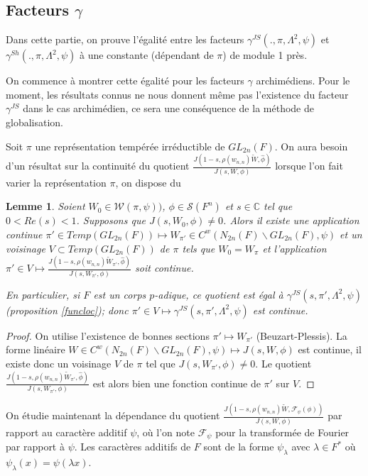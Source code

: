 \documentclass{amsart}
\newtheorem{lemme}{Lemme}[section]
\begin{document}
 \subsection{Facteurs $\gamma$}
 
 Dans cette partie, on prouve l'égalité entre les facteurs $\gamma^{JS}(., \pi, \Lambda^2, \psi)$ et $\gamma^{Sh}(., \pi, \Lambda^2, \psi)$ à une constante (dépendant de $\pi$) de module 1 près.
 
 On commence à montrer cette égalité pour les facteurs $\gamma$ archimédiens. Pour le moment, les résultats connus ne nous donnent même pas l'existence du facteur $\gamma^{JS}$ dans le cas archimédien, ce sera une conséquence de la méthode de globalisation.
 
 Soit $\pi$ une représentation tempérée irréductible de $GL_{2n}(F)$. On aura besoin d'un résultat sur la continuité du quotient $\frac{J(1-s, \rho(w_{n,n})\tilde{W}, \hat{\phi})}{J(s, W, \phi)}$ lorsque l'on fait varier la représentation $\pi$, on dispose du
 \begin{lemme}
 \label{cont}
 Soient $W_0 \in \mathcal{W}(\pi, \psi))$, $\phi \in \mathcal{S}(F^n)$ et $s \in \mathbb{C}$ tel que $0 < Re(s) < 1$. Supposons que $J(s, W_0, \phi) \neq 0$. Alors il existe une application continue  $\pi' \in Temp(GL_{2n}(F)) \mapsto W_{\pi'} \in C^w(N_{2n}(F)\backslash{GL_{2n}(F)}, \psi)$ et un voisinage $V \subset Temp(GL_{2n}(F))$ de $\pi$ tels que $W_0 = W_\pi$ et l'application $\pi' \in V \mapsto \frac{J(1-s, \rho(w_{n,n})\tilde{W}_{\pi'}, \hat{\phi})}{J(s, W_{\pi'}, \phi)}$ soit continue.
 
 En particulier, si $F$ est un corps $p$-adique, ce quotient est égal à $\gamma^{JS}(s, \pi', \Lambda^2, \psi)$ (proposition \ref{funcloc}); donc $\pi' \in V \mapsto \gamma^{JS}(s, \pi', \Lambda^2, \psi)$ est continue.
 \end{lemme}
 
 \begin{proof}
 On utilise l'existence de bonnes sections $\pi' \mapsto W_{\pi'}$ (Beuzart-Plessis). La forme linéaire $W \in C^w(N_{2n}(F)\backslash{GL_{2n}(F)}, \psi) \mapsto J(s, W, \phi)$ est continue, il existe donc un voisinage $V$ de $\pi$ tel que $J(s, W_{\pi'}, \phi) \neq 0$. Le quotient $\frac{J(1-s, \rho(w_{n,n})\tilde{W}_{\pi'}, \hat{\phi})}{J(s, W_{\pi'}, \phi)}$ est alors bien une fonction continue de $\pi'$ sur $V$. 
 \end{proof}
 
 On étudie maintenant la dépendance du quotient $\frac{J(1-s, \rho(w_{n,n})\tilde{W}, \mathcal{F}_\psi(\phi))}{J(s, W, \phi)}$ par rapport au caractère additif $\psi$, où l'on note $\mathcal{F}_\psi$ pour la transformée de Fourier par rapport à $\psi$. Les caractères additifs de $F$ sont de la forme $\psi_\lambda$ avec $\lambda \in F^*$ où $\psi_\lambda(x) = \psi(\lambda x)$.
 
\end{document}
